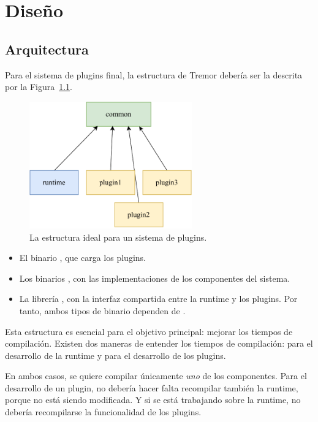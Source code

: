 
\chapter{Diseño}\label{sec:design}

\section{Arquitectura}

Para el sistema de plugins final, la estructura de Tremor debería ser la
descrita por la Figura~\ref{fig:separation}.

\begin{figure}
    \centering
    \includegraphics[width=7cm]{./Imagenes/separation.pdf}
    \caption{La estructura ideal para un sistema de plugins.}%
    \label{fig:separation}
\end{figure}

\begin{itemize}
    \item El binario , que carga los plugins.

    \item Los binarios , con las implementaciones de los
        componentes del sistema.

    \item La librería , con la interfaz compartida entre la runtime
        y los plugins. Por tanto, ambos tipos de binario dependen de
        .

\end{itemize}

Esta estructura es esencial para el objetivo principal: mejorar los tiempos de
compilación. Existen dos maneras de entender los tiempos de compilación: para el
desarrollo de la runtime y para el desarrollo de los plugins.

En ambos casos, se quiere compilar únicamente \emph{uno} de los componentes.
Para el desarrollo de un plugin, no debería hacer falta recompilar también la
runtime, porque no está siendo modificada. Y si se está trabajando sobre la
runtime, no debería recompilarse la funcionalidad de los plugins.

